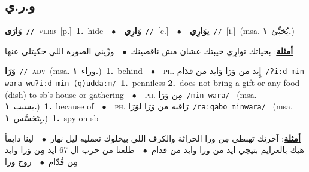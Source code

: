 \documentclass[10pt,a4paper,twoside]{article} %
\begin{document}
\begin{multicols}{2}
\vspace{-3mm}
\subsection*{\color{blue}\foreignlanguage{arabic}{و.ر.ي}\color{blue}{}} 

{\setlength\topsep{0pt}\textbf{\foreignlanguage{arabic}{وَارَى}}\ {\color{gray}\texttt{//}\color{black}}\ \textsc{verb}\ [p.]\ \textbf{1.}~hide\ \ $\bullet$\ \ \setlength\topsep{0pt}\textbf{\foreignlanguage{arabic}{وَارِي}}\ {\color{gray}\texttt{//}\color{black}}\ [c.]\ \ $\bullet$\ \ \setlength\topsep{0pt}\textbf{\foreignlanguage{arabic}{يوَارِي}}\ {\color{gray}\texttt{//}\color{black}}\ [i.]\ \color{gray}(msa. \foreignlanguage{arabic}{يُخبِّئ}~\foreignlanguage{arabic}{\textbf{١.}})\color{black}\  \begin{flushright}\color{gray}\foreignlanguage{arabic}{\textbf{\underline{\foreignlanguage{arabic}{أمثلة}}}: بحياتك توارِي خيبتك عشان مش ناقصينك\ $\bullet$\ \  ورِّيني الصورة اللي حكيتلي عنها}\end{flushright}\color{black}} \vspace{2mm}

{\setlength\topsep{0pt}\textbf{\foreignlanguage{arabic}{وَرَا}}\ {\color{gray}\texttt{//}\color{black}}\ \textsc{adv}\ \color{gray}(msa. \foreignlanguage{arabic}{وراء}~\foreignlanguage{arabic}{\textbf{١.}})\color{black}\ \textbf{1.}~behind\ \ $\bullet$\ \ \textsc{ph.} \color{gray} \foreignlanguage{arabic}{إِيد من وَرَا وَايد من قدَام}\color{black}\ {\color{gray}\texttt{/{\sffamily ʔiːd min wara wuʔiːd min (q)uddaːm}/}\color{black}}\ \textbf{1.}~penniless  \textbf{2.}~does not bring a gift or any food (dish) to sb's house or gathering\ \ $\bullet$\ \ \textsc{ph.} \color{gray} \foreignlanguage{arabic}{مِن وَرَا}\color{black}\ {\color{gray}\texttt{/{\sffamily min wara}/}\color{black}}\ \color{gray} (msa. \foreignlanguage{arabic}{بسبب}~\foreignlanguage{arabic}{\textbf{١.}})\color{black}\ \textbf{1.}~because of\ \ $\bullet$\ \ \textsc{ph.} \color{gray} \foreignlanguage{arabic}{رَاقبه من وَرَا لوَرَا}\color{black}\ {\color{gray}\texttt{/{\sffamily raːqabo minwara}/}\color{black}}\ \color{gray} (msa. \foreignlanguage{arabic}{يِتَجَسَّس}~\foreignlanguage{arabic}{\textbf{١.}})\color{black}\ \textbf{1.}~spy on sb\  \begin{flushright}\color{gray}\foreignlanguage{arabic}{\textbf{\underline{\foreignlanguage{arabic}{أمثلة}}}: آخرتك تهبطي مِن ورا الحراثة والكرف اللي بيخلوك تعمليه ليل نهار\ $\bullet$\ \  لينا دايماً هيك بالعزايم بتيجي ايد من ورا وايد من قدام\ $\bullet$\ \  طلعنا من حرب ال 67 ايد مِن وَرا وايد مِن قُدّام\ $\bullet$\ \  روح ورا}\end{flushright}\color{black}} \vspace{2mm}


\end{multicols}
\end{document}
